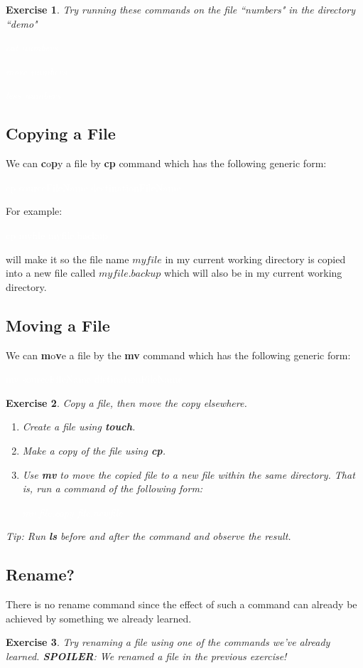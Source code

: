 \documentclass[oneside]{book}
\newcommand{\commandline}[1]{\begin{center} \colorbox{Dark}{\textcolor{white}{#1}} \end{center}}
\newtheorem{ex}{Exercise}[chapter]
\begin{document}
\begin{ex} Try running these commands on the file ``numbers" in the directory ``demo"
\commandline{cat numbers}
\commandline{more numbers}
\commandline{less numbers}

\end{ex}

\subsection{Copying a File}
We can \textbf{c}o\textbf{p}y a file by \textbf{cp} command which has the following generic form:
\commandline{cp sourceFileName destinationFileName}
For example:
\commandline{cp myfile myfile.backup}
will make it so the file name $myfile$ in my current working directory is copied into a new file called $myfile.backup$ which will also be in my current working directory.

\subsection{Moving a File}
We can \textbf{m}o\textbf{v}e a file by the \textbf{mv} command which has the following generic form:
\commandline{mv sourceFileName distinationFileName}
\vspace{0.3cm}
\begin{ex} Copy a file, then move the copy elsewhere.
    \begin{enumerate}
        \item Create a file using \textbf{touch}.
        \item Make a copy of the file using \textbf{cp}.
        \item Use \textbf{mv} to move the copied file to a new file within the same directory. That is, run a command of the following form:
        \commandline{mv file.copy file.newfile}
    \end{enumerate}
Tip: Run \textbf{ls} before and after the command and observe the result.
\end{ex}

\subsection{Rename?}
There is no rename command since the effect of such a command can already be achieved by something we already learned.
\vspace{0.3cm}

\begin{ex}
	Try renaming a file using one of the commands we've already learned. \textbf{SPOILER}: We renamed a file in the previous exercise!
\end{ex}	
\end{document}
